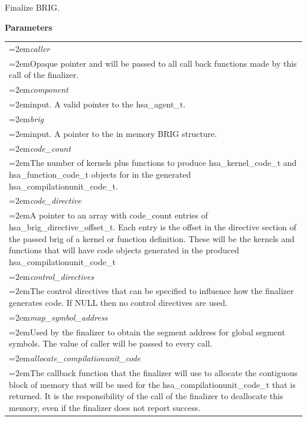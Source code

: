 \documentclass{book}
\newcommand{\hsaarg}[1]{\textit{#1}}
\begin{document}
\begin{appendices}
\begin{tcolorbox}[nobeforeafter,colframe=white,colback=lightgray,left=0mm]
\end{tcolorbox}
Finalize BRIG.

\noindent\textbf{Parameters}\\[-5mm]
\noindent\begin{longtable}{@{}>{\hangindent=2em}p{\textwidth}}
\hsaarg{caller}\\\hspace{2em}Opaque pointer and will be passed to all call back functions made by this call of the finalizer.\\[2mm]
\hsaarg{component}\\\hspace{2em}input. A valid pointer to the hsa\_agent\_t.\\[2mm]
\hsaarg{brig}\\\hspace{2em}input. A pointer to the in memory BRIG structure.\\[2mm]
\hsaarg{code\_count}\\\hspace{2em}The number of kernels plus functions to produce hsa\_kernel\_code\_t and hsa\_function\_code\_t objects for in the generated hsa\_compilationunit\_code\_t.\\[2mm]
\hsaarg{code\_directive}\\\hspace{2em}A pointer to an array with code\_count entries of hsa\_brig\_directive\_offset\_t. Each entry is the offset in the directive section of the passed brig of a kernel or function definition. These will be the kernels and functions that will have code objects generated in the produced hsa\_compilationunit\_code\_t\\[2mm]
\hsaarg{control\_directives}\\\hspace{2em}The control directives that can be specified to influence how the finalizer generates code. If NULL then no control directives are used.\\[2mm]
\hsaarg{map\_symbol\_address}\\\hspace{2em}Used by the finalizer to obtain the segment address for global segment symbols. The value of caller will be passed to every call.\\[2mm]
\hsaarg{allocate\_compilationunit\_code}\\\hspace{2em}The callback function that the finalizer will use to allocate the contiguous block of memory that will be used for the hsa\_compilationunit\_code\_t that is returned. It is the responsibility of the call of the finalizer to deallocate this memory, even if the finalizer does not report success.\\[2mm]

\end{longtable}
\end{appendices}
\end{document}
